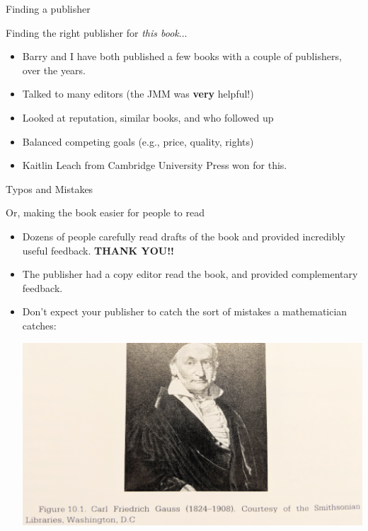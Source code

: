 \documentclass{beamer}
\begin{document}
\begin{frame}{Finding a publisher}
  \begin{block}{Finding the right publisher for {\em this book}...}
    \begin{itemize}
      \item Barry and I have both published a few books with a couple of publishers, over the years.
      \item Talked to many editors (the JMM was \textbf{very} helpful!)
      \item Looked at reputation, similar books, and who followed up
      \item Balanced competing goals (e.g., price, quality, rights)
      \item Kaitlin Leach from Cambridge University Press won for this.
    \end{itemize}
  \end{block}
\end{frame}

\begin{frame}{Typos and Mistakes}
  \begin{block}{Or, making the book easier for people to read}
    \begin{itemize}
      \item Dozens of people carefully read drafts of
            the book and provided incredibly useful feedback.
            \textbf{THANK YOU!!}
      \item The publisher had a copy editor read the book,
            and provided complementary feedback.
      \item Don't expect your publisher to catch the sort of
            mistakes a mathematician catches:
            \begin{center}
              \includegraphics[height=.38\textheight]{pics/gauss}
            \end{center}
    \end{itemize}
  \end{block}
\end{frame}
\end{document}
